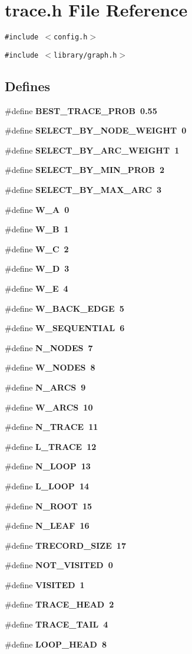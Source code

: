 \section{trace.h File Reference}
\label{trace_8h}
{\tt \#include $<$config.h$>$}\par
{\tt \#include $<$library/graph.h$>$}\par
\subsection*{Defines}
\begin{CompactItemize}
\item 
\#define \bf{BEST\_\-TRACE\_\-PROB}~0.55
\item 
\#define \bf{SELECT\_\-BY\_\-NODE\_\-WEIGHT}~0
\item 
\#define \bf{SELECT\_\-BY\_\-ARC\_\-WEIGHT}~1
\item 
\#define \bf{SELECT\_\-BY\_\-MIN\_\-PROB}~2
\item 
\#define \bf{SELECT\_\-BY\_\-MAX\_\-ARC}~3
\item 
\#define \bf{W\_\-A}~0
\item 
\#define \bf{W\_\-B}~1
\item 
\#define \bf{W\_\-C}~2
\item 
\#define \bf{W\_\-D}~3
\item 
\#define \bf{W\_\-E}~4
\item 
\#define \bf{W\_\-BACK\_\-EDGE}~5
\item 
\#define \bf{W\_\-SEQUENTIAL}~6
\item 
\#define \bf{N\_\-NODES}~7
\item 
\#define \bf{W\_\-NODES}~8
\item 
\#define \bf{N\_\-ARCS}~9
\item 
\#define \bf{W\_\-ARCS}~10
\item 
\#define \bf{N\_\-TRACE}~11
\item 
\#define \bf{L\_\-TRACE}~12
\item 
\#define \bf{N\_\-LOOP}~13
\item 
\#define \bf{L\_\-LOOP}~14
\item 
\#define \bf{N\_\-ROOT}~15
\item 
\#define \bf{N\_\-LEAF}~16
\item 
\#define \bf{TRECORD\_\-SIZE}~17
\item 
\#define \bf{NOT\_\-VISITED}~0
\item 
\#define \bf{VISITED}~1
\item 
\#define \bf{TRACE\_\-HEAD}~2
\item 
\#define \bf{TRACE\_\-TAIL}~4
\item 
\#define \bf{LOOP\_\-HEAD}~8
\end{CompactItemize}
